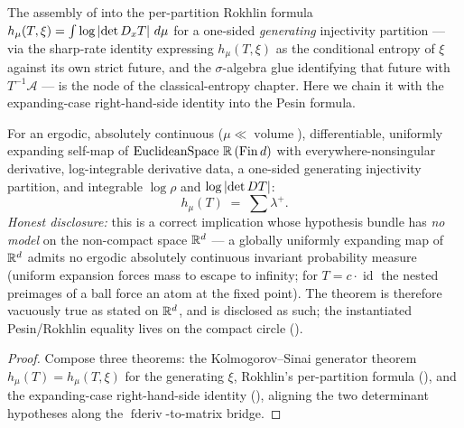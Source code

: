 The assembly of  into the per-partition Rokhlin
formula \(h_\mu(T,\xi) = \int\log\left\lvert \det D_xT \right\rvert\,d\mu\) for a one-sided \emph{generating}
injectivity partition --- via the sharp-rate identity expressing \(h_\mu(T,\xi)\) as the
conditional entropy of \(\xi\) against its own strict future, and the \(\sigma\)-algebra glue
identifying that future with \(T^{-1}\mathcal{A}\) --- is the node
 of the classical-entropy chapter. Here we chain
it with the expanding-case right-hand-side identity into the Pesin formula.

\begin{theorem}\label{pesin_formula_expanding}
  \leanok
  For an ergodic, absolutely continuous (\(\mu\ll\operatorname{volume}\)), differentiable,
  uniformly expanding self-map of \(\operatorname{EuclideanSpace}\,\mathbb{R}\,(\operatorname{Fin} d)\) with
  everywhere-nonsingular derivative, log-integrable derivative data, a one-sided generating
  injectivity partition, and integrable \(\log\rho\) and \(\log\left\lvert \det DT \right\rvert\):
  \[
    h_\mu(T) \;=\; \sum\lambda^{+}.
  \]
  \emph{Honest disclosure:} this is a correct implication whose hypothesis bundle has \emph{no
  model} on the non-compact space \(\mathbb{R}^d\) --- a globally uniformly expanding map of \(\mathbb{R}^d\)
  admits no ergodic absolutely continuous invariant probability measure (uniform expansion forces
  mass to escape to infinity; for \(T = c\cdot\operatorname{id}\) the nested preimages of a ball
  force an atom at the fixed point). The theorem is therefore vacuously true as stated on
  \(\mathbb{R}^d\), and is disclosed as such; the instantiated Pesin/Rokhlin equality lives on the compact
  circle ().
\end{theorem}
\begin{proof}\leanok
  Compose three theorems: the Kolmogorov--Sinai generator theorem \(h_\mu(T) = h_\mu(T,\xi)\) for
  the generating \(\xi\), Rokhlin's per-partition formula
  (), and the expanding-case right-hand-side
  identity (), aligning the two determinant
  hypotheses along the \(\operatorname{fderiv}\)-to-matrix bridge.
\end{proof}

